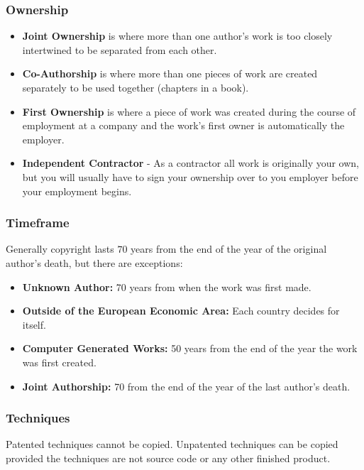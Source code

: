 \subsubsection{Ownership}\label{ssub:ownership}

\begin{itemize}
	\item \textbf{Joint Ownership} is where more than one author's work is too closely intertwined to be separated from each other.
	\item \textbf{Co-Authorship} is where more than one pieces of work are created separately to be used together (chapters in a book).
	\item \textbf{First Ownership} is where a piece of work was created during the course of employment at a company and the work's first owner is automatically the employer.
	\item \textbf{Independent Contractor} - As a contractor all work is originally your own, but you will usually have to sign your ownership over to you employer before your employment begins.
\end{itemize}

\subsubsection{Timeframe}\label{ssub:timeframe}

Generally copyright lasts \(70\) years from the end of the year of the original author's death, but there are exceptions:

\begin{itemize}
	\item \textbf{Unknown Author:} 70 years from when the work was first made.
	\item \textbf{Outside of the European Economic Area:} Each country decides for itself.
	\item \textbf{Computer Generated Works:} 50 years from the end of the year the work was first created.
	\item \textbf{Joint Authorship:} 70 from the end of the year of the last author's death.
\end{itemize}

\subsubsection{Techniques}\label{ssub:techniques}

Patented techniques cannot be copied.
Unpatented techniques can be copied provided the techniques are not source code or any other finished product.


